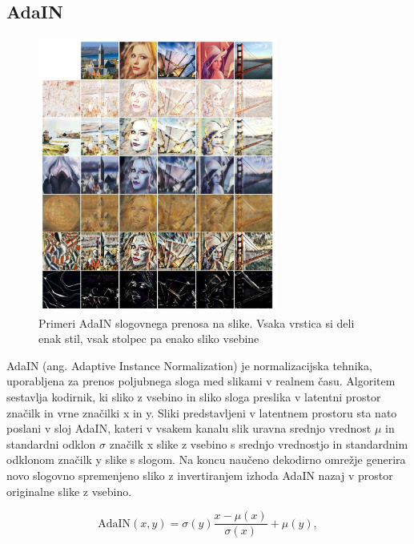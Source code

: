 \documentclass[a4paper,12pt,openright]{book}
\begin{document}
\subsection{AdaIN}

\begin{figure}[htb]
\begin{center}
  \includegraphics[width=0.7\textwidth]{images/adain_example.png}
\end{center}
  \caption{Primeri AdaIN slogovnega prenosa na slike. Vsaka vrstica si deli enak stil, vsak stolpec pa enako sliko vsebine}
  \label{AdaIN}
\end{figure}


AdaIN (ang. Adaptive Instance Normalization) \cite{huang2017adain} je normalizacijska tehnika, uporabljena za prenos poljubnega sloga med slikami v realnem času. Algoritem sestavlja kodirnik, ki sliko z vsebino in sliko sloga preslika v latentni prostor značilk in vrne značilki x in y. Sliki predstavljeni v latentnem prostoru sta nato poslani v sloj AdaIN, kateri v vsakem kanalu slik uravna srednjo vrednost $\mu$ in standardni odklon $\sigma$ značilk x slike z vsebino s srednjo vrednostjo in standardnim odklonom značilk y slike s slogom. Na koncu naučeno dekodirno omrežje generira novo slogovno spremenjeno sliko z invertiranjem izhoda AdaIN nazaj v prostor originalne slike z vsebino. 

\begin{equation}
\text{AdaIN}(x,y) = \sigma(y) \frac{x - \mu(x)}{\sigma(x)} + \mu(y),
\end{equation}
\end{document}
